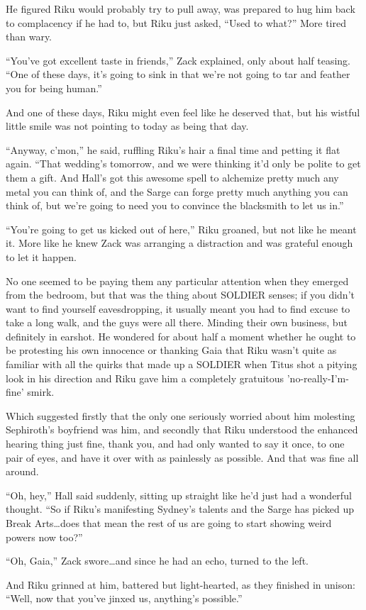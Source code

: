 He figured Riku would probably try to pull away, was prepared to hug him back to complacency if he had to, but Riku just asked, ``Used to what?'' More tired than wary.

``You've got excellent taste in friends,'' Zack explained, only about half teasing. ``One of these days, it's going to sink in that we're not going to tar and feather you for being human.''

And one of these days, Riku might even feel like he deserved that, but his wistful little smile was not pointing to today as being that day.

``Anyway, c'mon,'' he said, ruffling Riku's hair a final time and petting it flat again. ``That wedding's tomorrow, and we were thinking it'd only be polite to get them a gift. And Hall's got this awesome spell to alchemize pretty much any metal you can think of, and the Sarge can forge pretty much anything you can think of, but we're going to need you to convince the blacksmith to let us in.''

``You're going to get us kicked out of here,'' Riku groaned, but not like he meant it. More like he knew Zack was arranging a distraction and was grateful enough to let it happen.

No one seemed to be paying them any particular attention when they emerged from the bedroom, but that was the thing about SOLDIER senses; if you didn't want to find yourself eavesdropping, it usually meant you had to find excuse to take a long walk, and the guys were all there. Minding their own business, but definitely in earshot. He wondered for about half a moment whether he ought to be protesting his own innocence or thanking Gaia that Riku wasn't quite as familiar with all the quirks that made up a SOLDIER when Titus shot a pitying look in his direction and Riku gave him a completely gratuitous 'no-really-I'm-fine' smirk.

Which suggested firstly that the only one seriously worried about him molesting Sephiroth's boyfriend was him, and secondly that Riku understood the enhanced hearing thing just fine, thank you, and had only wanted to say it once, to one pair of eyes, and have it over with as painlessly as possible. And that was fine all around.

``Oh, hey,'' Hall said suddenly, sitting up straight like he'd just had a wonderful thought. ``So if Riku's manifesting Sydney's talents and the Sarge has picked up Break Arts\ldots does that mean the rest of us are going to start showing weird powers now too?''

``Oh, Gaia,'' Zack swore\ldots and since he had an echo, turned to the left.

And Riku grinned at him, battered but light-hearted, as they finished in unison: ``Well, now that you've jinxed us, anything's possible.''

